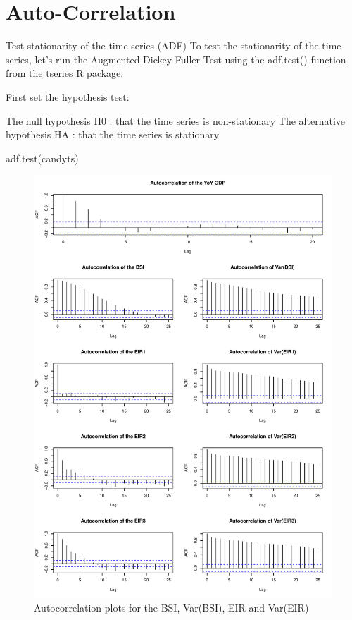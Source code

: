 \documentclass[12pt,a4paper,oneside]{book}
\begin{document}
\section{Auto-Correlation}

Test stationarity of the time series (ADF)
To test the stationarity of the time series, let’s run the Augmented Dickey-Fuller Test using the adf.test() function from the tseries R package.

First set the hypothesis test:

The null hypothesis H0 : that the time series is non-stationary The alternative hypothesis HA : that the time series is stationary

adf.test(candyts)

\begin{figure}[H]
    \centering
    \captionsetup{justification=centering}
    \includegraphics[scale=0.5]{Graphs/ACF.pdf}
    \caption{Autocorrelation plots for the BSI, Var(BSI), EIR and Var(EIR)}
    \label{fig:ACF}
\end{figure}
\end{document}
